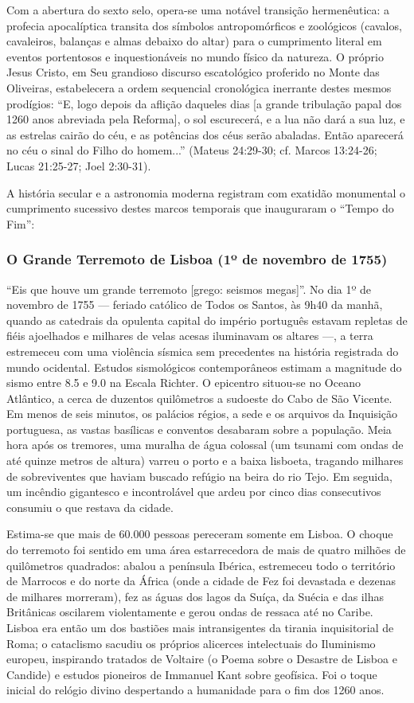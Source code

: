 \documentclass[11pt,a4paper,openany]{book}
\begin{document}
Com a abertura do sexto selo, opera-se uma notável transição hermenêutica: a profecia apocalíptica transita dos símbolos antropomórficos e zoológicos (cavalos, cavaleiros, balanças e almas debaixo do altar) para o cumprimento literal em eventos portentosos e inquestionáveis no mundo físico da natureza.
O próprio Jesus Cristo, em Seu grandioso discurso escatológico proferido no Monte das Oliveiras, estabelecera a ordem sequencial cronológica inerrante destes mesmos prodígios:
``E, logo depois da aflição daqueles dias [a grande tribulação papal dos 1260 anos abreviada pela Reforma], o sol escurecerá, e a lua não dará a sua luz, e as estrelas cairão do céu, e as potências dos céus serão abaladas. Então aparecerá no céu o sinal do Filho do homem...'' (Mateus 24:29-30; cf. Marcos 13:24-26; Lucas 21:25-27; Joel 2:30-31).

A história secular e a astronomia moderna registram com exatidão monumental o cumprimento sucessivo destes marcos temporais que inauguraram o ``Tempo do Fim'':


\subsubsection*{O Grande Terremoto de Lisboa (1º de novembro de 1755)}
``Eis que houve um grande terremoto [grego: seismos megas]''.
No dia 1º de novembro de 1755 — feriado católico de Todos os Santos, às 9h40 da manhã, quando as catedrais da opulenta capital do império português estavam repletas de fiéis ajoelhados e milhares de velas acesas iluminavam os altares —, a terra estremeceu com uma violência sísmica sem precedentes na história registrada do mundo ocidental.
Estudos sismológicos contemporâneos estimam a magnitude do sismo entre 8.5 e 9.0 na Escala Richter. O epicentro situou-se no Oceano Atlântico, a cerca de duzentos quilômetros a sudoeste do Cabo de São Vicente. Em menos de seis minutos, os palácios régios, a sede e os arquivos da Inquisição portuguesa, as vastas basílicas e conventos desabaram sobre a população. Meia hora após os tremores, uma muralha de água colossal (um tsunami com ondas de até quinze metros de altura) varreu o porto e a baixa lisboeta, tragando milhares de sobreviventes que haviam buscado refúgio na beira do rio Tejo. Em seguida, um incêndio gigantesco e incontrolável que ardeu por cinco dias consecutivos consumiu o que restava da cidade.

Estima-se que mais de 60.000 pessoas pereceram somente em Lisboa. O choque do terremoto foi sentido em uma área estarrecedora de mais de quatro milhões de quilômetros quadrados: abalou a península Ibérica, estremeceu todo o território de Marrocos e do norte da África (onde a cidade de Fez foi devastada e dezenas de milhares morreram), fez as águas dos lagos da Suíça, da Suécia e das ilhas Britânicas oscilarem violentamente e gerou ondas de ressaca até no Caribe. Lisboa era então um dos bastiões mais intransigentes da tirania inquisitorial de Roma; o cataclismo sacudiu os próprios alicerces intelectuais do Iluminismo europeu, inspirando tratados de Voltaire (o Poema sobre o Desastre de Lisboa e Candide) e estudos pioneiros de Immanuel Kant sobre geofísica. Foi o toque inicial do relógio divino despertando a humanidade para o fim dos 1260 anos.
\end{document}
